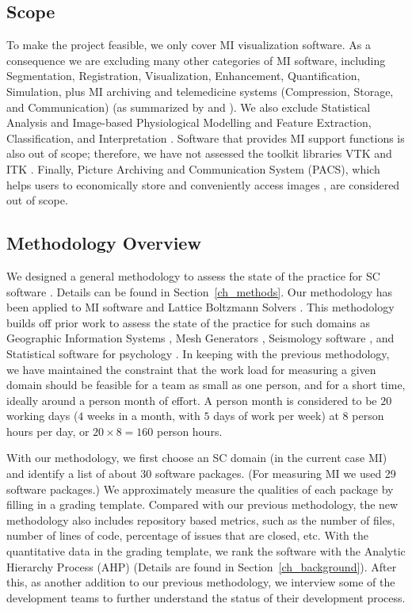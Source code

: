\documentclass[final, 3p, times, authoryear]{elsarticle}
\begin{document}
\subsection{Scope} \label{sec_scope}

To make the project feasible, we only cover MI visualization software.  As a
consequence we are excluding many other categories of MI software, including
Segmentation, Registration, Visualization, Enhancement, Quantification,
Simulation, plus MI archiving and telemedicine systems (Compression, Storage,
and Communication) (as summarized by \citet{Bankman2000} and
\citet{Angenent2006}).  We also exclude Statistical Analysis and Image-based
Physiological Modelling \citep{enwiki:1034877594} and Feature Extraction,
Classification, and Interpretation \citep{Kim2011}. Software that provides MI
support functions is also out of scope; therefore, we have not assessed the
toolkit libraries VTK \citep{SchroederEtAl2006} and ITK \citep{McCormick2014}.
Finally, Picture Archiving and Communication System (PACS), which helps users to
economically store and conveniently access images \citep{Choplin1992}, are
considered out of scope. 

\subsection{Methodology Overview}

We designed a general methodology to assess the state of the practice for SC
software \citep{SmithEtAl2021}. Details can be found in
Section~\ref{ch_methods}.  Our methodology has been applied to MI software
\citep{Dong2021} and Lattice Boltzmann Solvers \citep{Michalski2021}.  This
methodology builds off prior work to assess the state of the practice for such
domains as Geographic Information Systems \citep{smith2018state}, Mesh
Generators \citep{smith2016state}, Seismology software
\citep{Smith2018Seismology}, and Statistical software for psychology
\citep{smith2018statistical}.  In keeping with the previous methodology, we have
maintained the constraint that the work load for measuring a given domain should
be feasible for a team as small as one person, and for a short time, ideally
around a person month of effort. A person month is considered to be $20$ working
days ($4$ weeks in a month, with $5$ days of work per week) at $8$ person hours
per day, or $20 \times 8 = 160$ person hours.

With our methodology, we first choose an SC domain (in the current case MI) and
identify a list of about 30 software packages. (For measuring MI we used 29
software packages.)  We approximately measure the qualities of each package by
filling in a grading template. Compared with our previous methodology, the new
methodology also includes repository based metrics, such as the number of files,
number of lines of code, percentage of issues that are closed, etc.  With the
quantitative data in the grading template, we rank the software with the
Analytic Hierarchy Process (AHP) (Details are found in
Section~\ref{ch_background}). After this, as another addition to our previous
methodology, we interview some of the development teams to further understand
the status of their development process.
\end{document}
